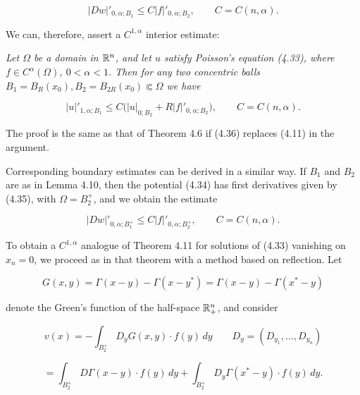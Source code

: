 \begin{equation}
\tag{4.36}
\lvert Dw\rvert'_{0,\alpha;B_{1}}\leq C\lvert f\rvert'_{0,\alpha;B_{2}}, \qquad C=C(n,\alpha).
\end{equation}

We can, therefore, assert a $C^{1,\alpha}$ interior estimate:

\begin{theorem}\label{gt:thm-poisson-first-derivative-interior}
\textit{Let $\Omega$ be a domain in $\mathbb{R}^{n}$, and let $u$ satisfy Poisson's equation (4.33), where $f\in C^{\alpha}(\Omega)$, $0<\alpha<1$. Then for any two concentric balls $B_{1}=B_{R}(x_{0}), B_{2}=B_{2R}(x_{0})\Subset \Omega$ we have}

\begin{equation}
\tag{4.37}
\lvert u\rvert'_{1,\alpha;B_{1}}\leq C\bigl(\lvert u\rvert_{0;B_{2}}+R\lvert f\rvert'_{0,\alpha;B_{2}}\bigr), \qquad C=C(n,\alpha).
\end{equation}

The proof is the same as that of Theorem 4.6 if (4.36) replaces (4.11) in the argument.

Corresponding boundary estimates can be derived in a similar way. If $B_{1}$ and $B_{2}$ are as in Lemma 4.10, then the potential (4.34) has first derivatives given by (4.35), with $\Omega=B_{2}^{+}$, and we obtain the estimate

\begin{equation}
\tag{4.38}
\lvert Dw\rvert'_{0,\alpha;B_{1}^{+}}\leq C\lvert f\rvert'_{0,\alpha;B_{2}^{+}}, \qquad C=C(n,\alpha).
\end{equation}

To obtain a $C^{1,\alpha}$ analogue of Theorem 4.11 for solutions of (4.33) vanishing on $x_{n}=0$, we proceed as in that theorem with a method based on reflection. Let

\[
G(x,y)=\Gamma(x-y)-\Gamma(x-y^{*})=\Gamma(x-y)-\Gamma(x^{*}-y)
\]

denote the Green's function of the half-space $\mathbb{R}_{+}^{n}$, and consider

\begin{equation}
\tag{4.39}
v(x)=-\int_{B_{2}^{+}}D_{y}G(x,y)\cdot f(y)\,dy
\qquad D_{y}=(D_{y_{1}},\ldots,D_{y_{n}})
\end{equation}

\[
=\int_{B_{2}^{+}}D\Gamma(x-y)\cdot f(y)\,dy+\int_{B_{2}^{+}}D_{y}\Gamma(x^{*}-y)\cdot f(y)\,dy.
\]


\end{theorem}
